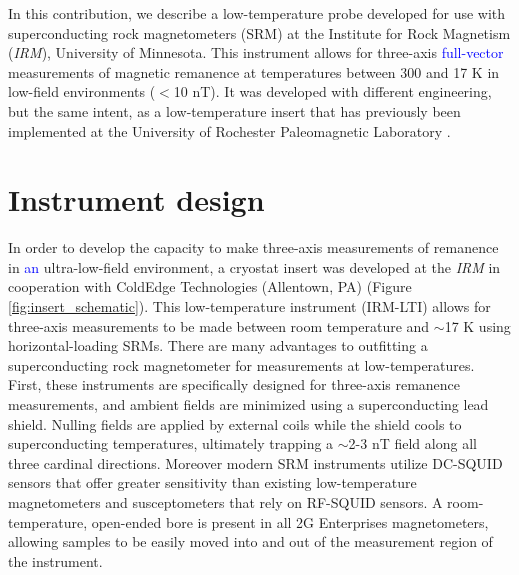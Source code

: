 \documentclass[draft,gc]{AGUTeX}
\begin{document}
\begin{article}
In this contribution, we describe a low-temperature probe developed for use with superconducting rock magnetometers (SRM) at the Institute for Rock Magnetism (\textit{IRM}), University of Minnesota. This instrument allows for three-axis \textcolor{blue}{full-vector} measurements of magnetic remanence at temperatures between 300 and 17 K in low-field environments ($<$10 nT). It was developed with different engineering, but the same intent, as a low-temperature insert that has previously been implemented at the University of Rochester Paleomagnetic Laboratory \citep{Smirnov2011a}.

\section{Instrument design}

In order to develop the capacity to make three-axis measurements of remanence in \textcolor{blue}{an} ultra-low-field environment, a cryostat insert was developed at the \textit{IRM} in cooperation with ColdEdge Technologies (Allentown, PA) (Figure \ref{fig:insert_schematic}). This low-temperature instrument (IRM-LTI) allows for three-axis measurements to be made between room temperature and $\sim$17 K using horizontal-loading SRMs. There are many advantages to outfitting a superconducting rock magnetometer for measurements at low-temperatures. First, these instruments are specifically designed for three-axis remanence measurements, and ambient fields are minimized using a superconducting lead shield. Nulling fields are applied by external coils while the shield cools to superconducting temperatures, ultimately trapping a $\sim$2-3 nT field along all three cardinal directions. Moreover modern SRM instruments utilize DC-SQUID sensors that offer greater sensitivity than existing low-temperature magnetometers and susceptometers that rely on RF-SQUID sensors. A room-temperature, open-ended bore is present in all 2G Enterprises magnetometers, allowing samples to be easily moved into and out of the measurement region of the instrument. 


\end{article}
\end{document}
